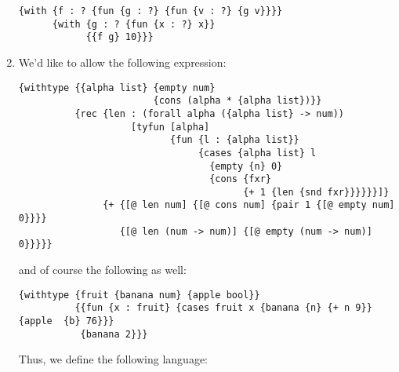 \begin{enumerate}
{
\begin{verbatim}
{with {f : ? {fun {g : ?} {fun {v : ?} {g v}}}}
      {with {g : ? {fun {x : ?} x}}
            {{f g} 10}}}
\end{verbatim}
}

\item We'd like to allow the following expression:

\begin{verbatim}
{withtype {{alpha list} {empty num}
                        {cons (alpha * {alpha list})}}
          {rec {len : (forall alpha ({alpha list} -> num))
                    [tyfun [alpha]
                           {fun {l : {alpha list}}
                                {cases {alpha list} l
                                  {empty {n} 0}
                                  {cons {fxr}
                                        {+ 1 {len {snd fxr}}}}}}]}
               {+ {[@ len num] {[@ cons num] {pair 1 {[@ empty num] 0}}}}
                  {[@ len (num -> num)] {[@ empty (num -> num)] 0}}}}}
\end{verbatim}
and of course the following as well:
\begin{verbatim}
{withtype {fruit {banana num} {apple bool}}
          {{fun {x : fruit} {cases fruit x {banana {n} {+ n 9}} {apple  {b} 76}}}
           {banana 2}}}
\end{verbatim}

Thus, we define the following language:


\end{enumerate}

